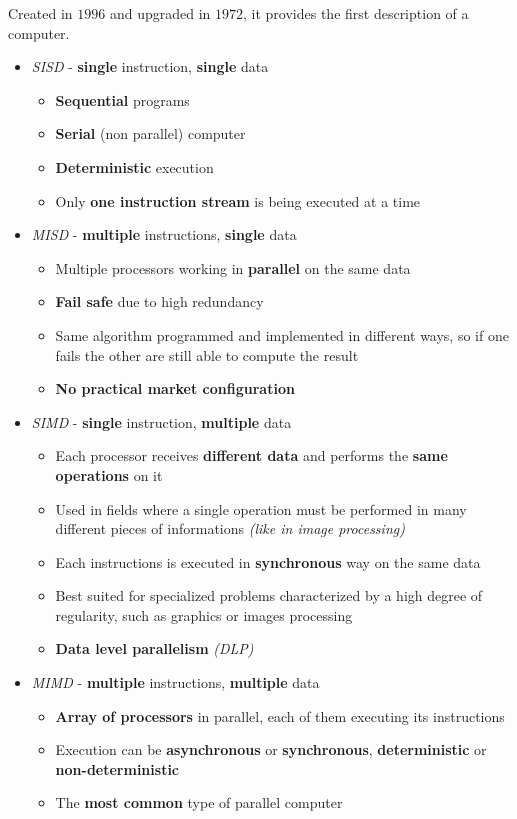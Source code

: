 \documentclass[english]{article}
\begin{document}
Created in \(1996\) and upgraded in \(1972\), it provides the first description of a computer.

\begin{itemize}
  \item \textit{SISD} - \textbf{single} instruction, \textbf{single} data
        \begin{itemize}
          \item \textbf{Sequential} programs
          \item \textbf{Serial} (non parallel) computer
          \item \textbf{Deterministic} execution
          \item Only \textbf{one instruction stream} is being executed at a time
        \end{itemize}
  \item \textit{MISD} - \textbf{multiple} instructions, \textbf{single} data
        \begin{itemize}
          \item Multiple processors working in \textbf{parallel} on the same data
          \item \textbf{Fail safe} due to high redundancy
          \item Same algorithm programmed and implemented in different ways, so if one fails the other are still able to compute the result
          \item \textbf{No practical market configuration}
        \end{itemize}
  \item \textit{SIMD} - \textbf{single} instruction, \textbf{multiple} data
        \begin{itemize}
          \item Each processor receives \textbf{different data} and performs the \textbf{same operations} on it
          \item Used in fields where a single operation must be performed in many different pieces of informations \textit{(like in image processing)}
          \item Each instructions is executed in \textbf{synchronous} way on the same data
          \item Best suited for specialized problems characterized by a high degree of regularity, such as graphics or images processing
          \item \textbf{Data level parallelism} \textit{(DLP)}
        \end{itemize}
  \item \textit{MIMD} - \textbf{multiple} instructions, \textbf{multiple} data
        \begin{itemize}
          \item \textbf{Array of processors} in parallel, each of them executing its instructions
          \item Execution can be \textbf{asynchronous} or \textbf{synchronous}, \textbf{deterministic} or \textbf{non-deterministic}
          \item The \textbf{most common} type of parallel computer
        \end{itemize}
\end{itemize}
\end{document}
